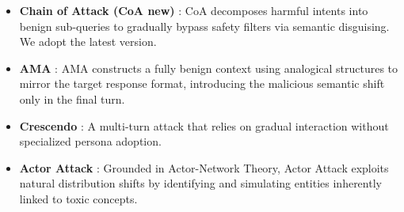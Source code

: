 \documentclass[11pt]{article}
\begin{document}
\begin{itemize}[leftmargin=*,nosep]
    \item \textbf{Chain of Attack (CoA new)} \cite{yang-etal-2025-chain}: CoA decomposes harmful intents into benign sub-queries to gradually bypass safety filters via semantic disguising. We adopt the latest version.
    \item \textbf{AMA} \cite{analogy2025}: AMA constructs a fully benign context using analogical structures to mirror the target response format, introducing the malicious semantic shift only in the final turn.
    \item \textbf{Crescendo} \cite{russinovich2025great}: A multi-turn attack that relies on gradual interaction without specialized persona adoption. %
    \item \textbf{Actor Attack} \cite{ren2024llms}:  Grounded in Actor-Network Theory, Actor Attack exploits natural distribution shifts by identifying and simulating entities inherently linked to toxic concepts.
\end{itemize}



\end{document}

